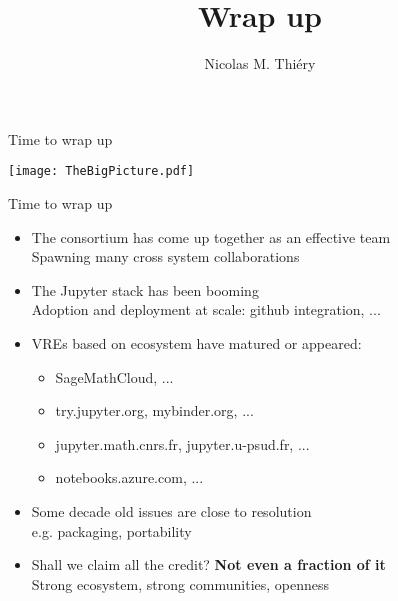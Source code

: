 \documentclass{beamer}
\author{Nicolas M. Thiéry}
\title{Wrap up}
\begin{document}
\begin{frame}{Time to wrap up}

  \hspace{-1cm}\texttt{[image: TheBigPicture.pdf]}
\end{frame}

\begin{frame}{Time to wrap up}
  \begin{itemize}
  \item The consortium has come up together as an effective team\\
    Spawning many cross system collaborations
    \pause\bigskip
  \item The Jupyter stack has been booming\\
    Adoption and deployment at scale: github integration, ...
    \pause\bigskip
  \item VREs based on ecosystem have matured or appeared:
    \begin{itemize}
    \item SageMathCloud, ...
    \item try.jupyter.org, mybinder.org, ...
    \item jupyter.math.cnrs.fr, jupyter.u-psud.fr, ...
    \item notebooks.azure.com, ...
    \end{itemize}
    \pause\bigskip
  \item Some decade old issues are close to resolution\\
    e.g. packaging, portability
    \pause\bigskip
  \item Shall we claim all the credit? \pause \textbf{Not even a fraction of it}\\
    Strong ecosystem, strong communities, openness
  \end{itemize}
\end{frame}
\end{document}
